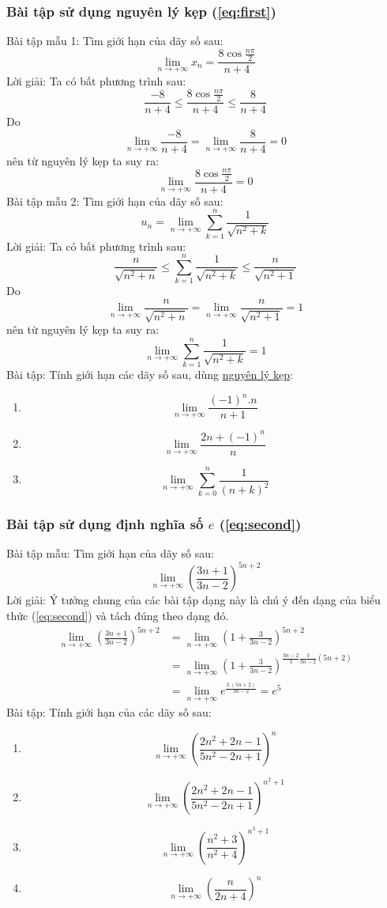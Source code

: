 \subsubsection{Bài tập sử dụng nguyên lý kẹp (\ref{eq:first})}
Bài tập mẫu 1: Tìm giới hạn của dãy số sau: $$\lim_{n\to+\infty}x_{n}=\frac{8\cos{\frac{n\pi}{2}}}{n+4}$$
Lời giải: Ta có bất phương trình sau:
$$\frac{-8}{n+4}\leq\frac{8\cos{\frac{n\pi}{2}}}{n+4}\leq\frac{8}{n+4}$$
Do $$\lim_{n\to+\infty}\frac{-8}{n+4}=\lim_{n\to+\infty}\frac{8}{n+4}=0$$
nên từ nguyên lý kẹp ta suy ra: $$\lim_{n\to+\infty}\frac{8\cos{\frac{n\pi}{2}}}{n+4}=0$$
Bài tập mẫu 2: Tìm giới hạn của dãy số sau:$$u_{n}=\lim_{n\to+\infty}\sum_{k=1}^{n}\frac{1}{\sqrt{n^2+k}}$$
Lời giải: Ta có bất phương trình sau:
$$\frac{n}{\sqrt{n^2+n}}\leq\sum_{k=1}^{n}\frac{1}{\sqrt{n^2+k}}\leq\frac{n}{\sqrt{n^2+1}}$$
Do
$$\lim_{n\to+\infty}\frac{n}{\sqrt{n^2+n}}=\lim_{n\to+\infty}\frac{n}{\sqrt{n^2+1}}=1$$
nên từ nguyên lý kẹp ta suy ra:
$$\lim_{n\to+\infty}\sum_{k=1}^{n}\frac{1}{\sqrt{n^2+k}}=1$$
Bài tập: Tính giới hạn các dãy số sau, dùng \underline{nguyên lý kẹp}:
\begin{enumerate}
    \item $$\lim_{n\to+\infty}\frac{(-1)^n.n}{n+1}$$
    \item $$\lim_{n\to+\infty}\frac{2n+(-1)^n}{n}$$
    \item $$\lim_{n\to+\infty}\sum_{k=0}^{n}\frac{1}{(n+k)^2}$$
\end{enumerate}
\subsubsection{Bài tập sử dụng định nghĩa số $e$ (\ref{eq:second})}
Bài tập mẫu: Tìm giới hạn của dãy số sau: $$\lim_{n\to+\infty}\left(\frac{3n+1}{3n-2}\right)^{5n+2}$$
Lời giải: Ý tưởng chung của các bài tập dạng này là chú ý đến dạng của biểu thức (\ref{eq:second}) và tách đúng theo dạng đó.
\begin{equation*}
\begin{split}
\lim_{n\to+\infty}\left(\frac{3n+1}{3n-2}\right)^{5n+2}&=\lim_{n\to+\infty}\left(1+\frac{3}{3n-2}\right)^{5n+2}\\&=\lim_{n\to+\infty}\left(1+\frac{3}{3n-2}\right)^{\frac{3n-2}{3}\frac{3}{3n-2}(5n+2)}\\&=\lim_{n\to+\infty}e^{\frac{3.(5n+2)}{3n-2}}=e^5
\end{split}
\end{equation*}
Bài tập: Tính giới hạn của các dãy số sau:
\begin{enumerate}
    \item $$\lim_{n\to+\infty}\left(\frac{2n^2+2n-1}{5n^2-2n+1}\right)^{n}$$
    \item $$\lim_{n\to+\infty}\left(\frac{2n^2+2n-1}{5n^2-2n+1}\right)^{n^2+1}$$
    \item $$\lim_{n\to+\infty}\left(\frac{n^2+3}{n^2+4}\right)^{n^3+1}$$
    \item $$\lim_{n\to+\infty}\left(\frac{n}{2n+4}\right)^{n}$$
\end{enumerate}

